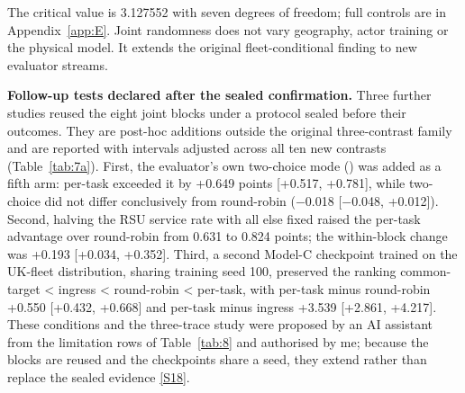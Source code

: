\documentclass[12pt,a4paper]{article}
\begin{document}
The critical value is 3.127552 with seven degrees of freedom; full controls are in Appendix~\ref{app:E}. Joint randomness does not vary geography, actor training or the physical model. It extends the original fleet-conditional finding to new evaluator streams.

\textbf{Follow-up tests declared after the sealed confirmation.} Three further studies reused the eight joint blocks under a protocol sealed before their outcomes. They are post-hoc additions outside the original three-contrast family and are reported with intervals adjusted across all ten new contrasts (Table~\ref{tab:7a}). First, the evaluator's own two-choice mode () was added as a fifth arm: per-task exceeded it by +0.649 points [+0.517, +0.781], while two-choice did not differ conclusively from round-robin (\ensuremath{-}0.018 [\ensuremath{-}0.048, +0.012]). Second, halving the RSU service rate with all else fixed raised the per-task advantage over round-robin from 0.631 to 0.824 points; the within-block change was +0.193 [+0.034, +0.352]. Third, a second Model-C checkpoint trained on the UK-fleet distribution, sharing training seed 100, preserved the ranking common-target < ingress < round-robin < per-task, with per-task minus round-robin +0.550 [+0.432, +0.668] and per-task minus ingress +3.539 [+2.861, +4.217]. These conditions and the three-trace study were proposed by an AI assistant from the limitation rows of Table~\ref{tab:8} and authorised by me; because the blocks are reused and the checkpoints share a seed, they extend rather than replace the sealed evidence \hyperref[source-s18]{[S18]}.
\end{document}

